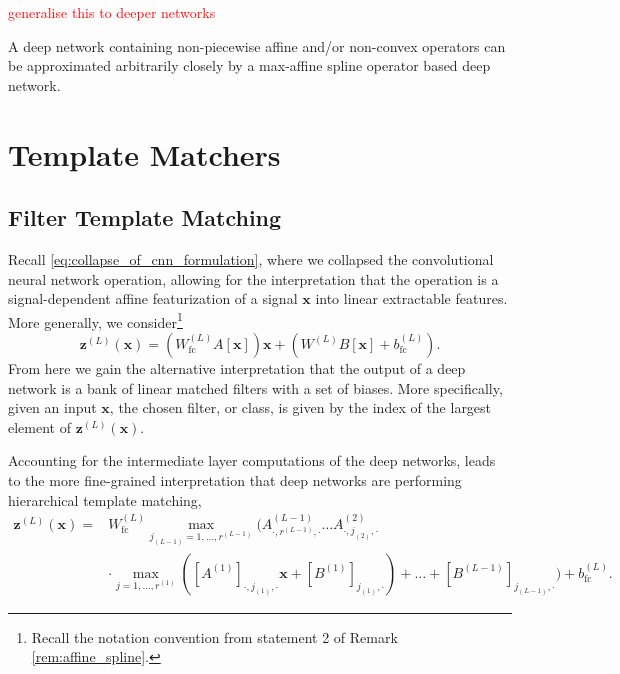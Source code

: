 \textcolor{Red}{generalise this to deeper networks}

\begin{corollary}
    A deep network containing non-piecewise affine and/or non-convex operators can be approximated arbitrarily closely by a max-affine spline operator based deep network.
\end{corollary}

\section{Template Matchers}\label{sec:template_matchers}

\subsection{Filter Template Matching}

Recall \eqref{eq:collapse_of_cnn_formulation}, where we collapsed the convolutional neural network operation, allowing for the interpretation that the operation is a signal-dependent affine featurization of a signal $\mathbf{x}$ into linear extractable features. More generally, we consider\footnote{Recall the notation convention from statement 2 of Remark \ref{rem:affine_spline}.} 
\begin{equation}\label{eq:matched_filterbank}
    \mathbf{z}^{(L)}(\mathbf{x})=\left(W_{\text{fc}}^{(L)}A[\mathbf{x}]\right)\mathbf{x}+\left(W^{(L)}B[\mathbf{x}]+b_{\text{fc}}^{(L)}\right).
\end{equation}
From here we gain the alternative interpretation that the output of a deep network is a bank of linear matched filters with a set of biases. More specifically, given an input $\mathbf{x}$, the chosen filter, or class, is given by the index of the largest element of $\mathbf{z}^{(L)}(\mathbf{x})$.

Accounting for the intermediate layer computations of the deep networks, leads to the more fine-grained interpretation that deep networks are performing hierarchical template matching, 
\begin{align}\label{eq:hierarchical_template_matching}
    \mathbf{z}^{(L)}(\mathbf{x})=&W_{\text{fc}}^{(L)}\max_{j_{(L-1)}=1,\dots,r^{(L-1)}}\bigg(A_{\cdot,r^{(L-1)},\cdot}^{(L-1)}\dots A^{(2)}_{\cdot,j_{(2)},\cdot}\nonumber\\&\cdot\max_{j=1,\dots,r^{(1)}}\left(\left[A^{(1)}\right]_{\cdot,j_{(1)},\cdot}\mathbf{x}+\left[B^{(1)}\right]_{j_(1),\cdot}\right)+\dots+\left[B^{(L-1)}\right]_{j_{(L-1)},\cdot}\bigg)+b_{\text{fc}}^{(L)}.
\end{align}

